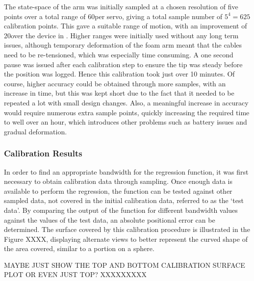 \documentclass[11pt]{article}
\begin{document}
The state-space of the arm was initially sampled at a chosen resolution of five points over a total range of 60\degree per servo, giving a total sample number of $5^4 = 625$ calibration points. This gave a suitable range of motion, with an improvement of 20\degree over the device in \cite{GreggSmithDesign}. Higher ranges were initially used without any long term issues, although temporary deformation of the foam arm meant that the cables need to be re-tensioned, which was especially time consuming. A one second pause was issued after each calibration step to ensure the tip was steady before the position was logged. Hence this calibration took just over 10 minutes. Of course, higher accuracy could be obtained through more samples, with an increase in time, but this was kept short due to the fact that it needed to be repeated a lot with small design changes. Also, a meaningful increase in accuracy would require numerous extra sample points, quickly increasing the required time to well over an hour, which introduces other problems such as battery issues and gradual deformation.

\subsubsection{Calibration Results}
In order to find an appropriate bandwidth for the regression function, it was first necessary to obtain calibration data through sampling. Once enough data is available to perform the regression, the function can be tested against other sampled data, not covered in the initial calibration data, referred to as the `test data'. By comparing the output of the function for different bandwidth values against the values of the test data, an absolute positional error can be determined. The surface covered by this calibration procedure is illustrated in the Figure XXXX, displaying alternate views to better represent the curved shape of the area covered, similar to a portion on a sphere.



MAYBE JUST SHOW THE TOP AND BOTTOM CALIBRATION SURFACE PLOT OR EVEN JUST TOP? XXXXXXXXX
\end{document}
